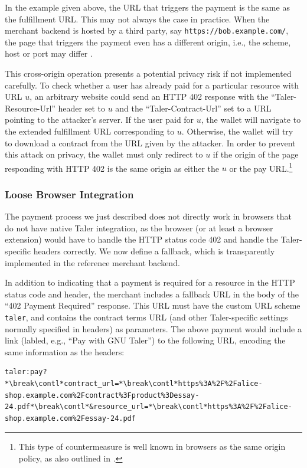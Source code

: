 In the example given above, the URL that triggers the payment is the same as the fulfillment URL.
This may not always the case in practice.  When the merchant backend is hosted by a third
party, say \nolinkurl{https://bob.example.com/}, the page that triggers the payment
even has a different origin, i.e., the scheme, host or port may differ \cite{rfc6454}.

This cross-origin operation presents a potential privacy risk if not
implemented carefully.
To check whether a user has already paid for a particular
resource with URL $u$, an arbitrary website could send an HTTP 402 response with
the ``Taler-Resource-Url'' header set to $u$ and the ``Taler-Contract-Url''
set to a URL pointing to the attacker's server.  If the user paid for $u$, the
wallet will navigate to the extended fulfillment URL corresponding to $u$.
Otherwise, the wallet will try to download a contract from the URL given by the
attacker.  In order to prevent this attack on privacy, the wallet must only
redirect to $u$ if the origin of the page responding with HTTP 402 is the same
origin as either the $u$ or the pay URL.\footnote{This type of countermeasure is well
known in browsers as the same origin policy, as also outlined in \cite{rfc6454}.}

\subsubsection{Loose Browser Integration}\label{sec:loose-browser-integration}

The payment process we just described does not directly work in browsers that do not
have native Taler integration, as the browser (or at least a browser extension)
would have to handle the HTTP status code 402 and handle the Taler-specific headers correctly.
We now define a fallback, which is transparently implemented in the reference merchant backend.

In addition to indicating that a payment is required for a resource in the HTTP status code and header,
the merchant includes a fallback URL in the body of the ``402 Payment Required'' response.  This URL must have the custom URL scheme
\texttt{taler}, and contains the contract terms URL (and other Taler-specific settings normally specified in headers)
as parameters.  The above payment would include a link (labled, e.g., ``Pay with GNU Taler'') to the following URL, encoding
the same information as the headers:
\begin{lstlisting}[style=myhttp]
taler:pay?*\break\contl*contract_url=*\break\contl*https%3A%2F%2Falice-shop.example.com%2Fcontract%3Fproduct%3Dessay-24.pdf*\break\contl*&resource_url=*\break\contl*https%3A%2F%2Falice-shop.example.com%2Fessay-24.pdf
\end{lstlisting}

